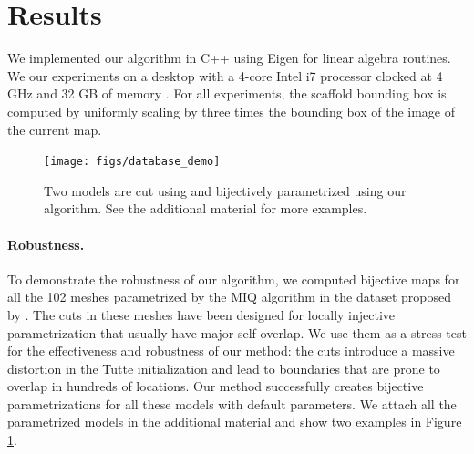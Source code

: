 \section{Results}
We implemented our algorithm in C++ using Eigen for linear algebra routines. We  our experiments on a desktop with a 4-core Intel i7  processor clocked at 4 GHz and 32 GB of memory . For all experiments, the scaffold bounding box is computed by uniformly scaling by three times the bounding box of the image of the current map. 

\begin{figure}[t]
\texttt{[image: figs/database\_demo]}
\caption{Two models are cut using \cite{Bommes:2009} and bijectively parametrized using our algorithm. See the additional material for more examples.}
\label{scaf:fig:miq_database}
\vspace{-0.2cm}
\end{figure}

\paragraph{Robustness.} To demonstrate the robustness of our algorithm, we computed  bijective maps for all the 102 meshes parametrized by the MIQ algorithm \cite{Bommes:2009}  in the dataset proposed by \cite{Myles:2014}. The cuts in these meshes have been designed for locally injective parametrization that usually have major self-overlap. We use them as a stress test for the effectiveness and robustness of our method:  the cuts introduce a massive distortion in the Tutte initialization and lead to boundaries that are prone to overlap in hundreds of locations. Our method successfully creates bijective parametrizations for all these models with default parameters. We attach all the parametrized models in the additional material and show two examples in Figure \ref{scaf:fig:miq_database}. 



